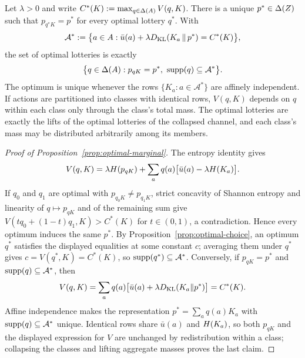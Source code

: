 \begin{proposition}\label{prop:optimal-marginal}
Let $\lambda>0$ and write $C^*(K):=\max_{q\in\Delta(A)}V(q,K)$.  There is a unique $p^*\in\Delta(Z)$ such that
$p_{q^*K}=p^*$ for every optimal lottery $q^*$.  With
\[
 \mathcal A^*
 :=\bigl\{a\in A:
 \bar u(a)+\lambda
 D_{\mathrm{KL}}\!\left(K_a\,\middle\|\,p^*\right)=C^*(K)
 \bigr\},
\]
the set of optimal lotteries is exactly
\[
 \bigl\{q\in\Delta(A):
 p_{qK}=p^*,\ \operatorname{supp}(q)\subseteq\mathcal A^*
 \bigr\}.
\]
The optimum is unique whenever the rows $\{K_a:a\in\mathcal A^*\}$ are affinely independent.  If actions are
partitioned into classes with identical rows, $V(q,K)$ depends on $q$ within each class only through the class's
total mass.  The optimal lotteries are exactly the lifts of the optimal lotteries of the collapsed channel, and
each class's mass may be distributed arbitrarily among its members.
\end{proposition}

\begin{proof}[Proof of Proposition~\ref{prop:optimal-marginal}]
The entropy identity gives
\[
 V(q,K)
 =\lambda H(p_{qK})
  +\sum_aq(a)\bigl[\bar u(a)-\lambda H(K_a)\bigr].
\]
If $q_0$ and $q_1$ are optimal with $p_{q_0K}\ne p_{q_1K}$, strict concavity of Shannon entropy and linearity of
$q\mapsto p_{qK}$ and of the remaining sum give $V(tq_0+(1-t)q_1,K)>C^*(K)$ for $t\in(0,1)$, a contradiction.
Hence every optimum induces the same $p^*$.  By Proposition~\ref{prop:optimal-choice}, an optimum $q^*$ satisfies
the displayed equalities at some constant $c$; averaging them under $q^*$ gives $c=V(q^*,K)=C^*(K)$, so
$\operatorname{supp}(q^*)\subseteq\mathcal A^*$.  Conversely, if $p_{qK}=p^*$ and $\operatorname{supp}(q)\subseteq\mathcal A^*$, then
\[
 V(q,K)
 =\sum_aq(a)\bigl[\bar u(a)+\lambda D_{\mathrm{KL}}(K_a\|p^*)\bigr]
 =C^*(K).
\]
Affine independence makes the representation $p^*=\sum_aq(a)K_a$ with $\operatorname{supp}(q)\subseteq\mathcal A^*$ unique.
Identical rows share $\bar u(a)$ and $H(K_a)$, so both $p_{qK}$ and the displayed expression for $V$ are
unchanged by redistribution within a class; collapsing the classes and lifting aggregate masses proves the last
claim.
\end{proof}

